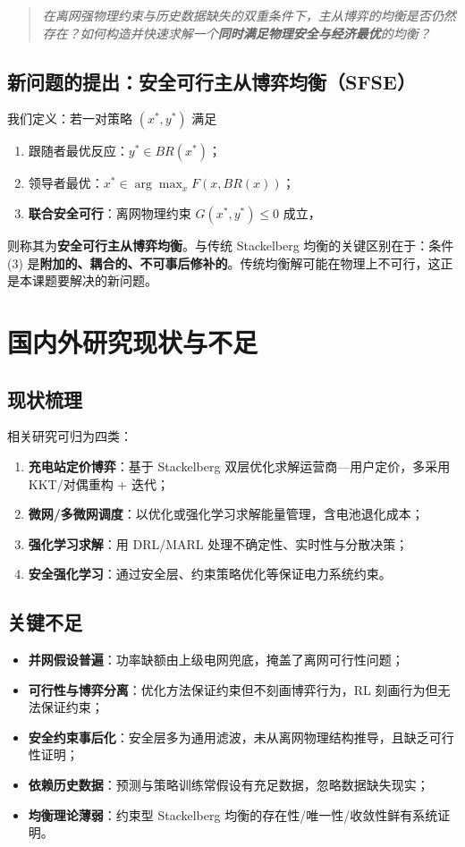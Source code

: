 \documentclass[UTF8,a4paper,11pt]{ctexart}
\begin{document}
\begin{quote}
\itshape 在离网强物理约束与历史数据缺失的双重条件下，主从博弈的均衡是否仍然存在？如何构造并快速求解一个\textbf{同时满足物理安全与经济最优}的均衡？
\end{quote}

\subsection{新问题的提出：安全可行主从博弈均衡（SFSE）}
我们定义：若一对策略 $(x^*, y^*)$ 满足
\begin{enumerate}
  \item 跟随者最优反应：$y^* \in BR(x^*)$；
  \item 领导者最优：$x^* \in \arg\max_{x} F(x, BR(x))$；
  \item \textbf{联合安全可行}：离网物理约束 $G(x^*, y^*) \le 0$ 成立，
\end{enumerate}
则称其为\textbf{安全可行主从博弈均衡}。与传统 Stackelberg 均衡的关键区别在于：条件 (3) 是\textbf{附加的、耦合的、不可事后修补的}。传统均衡解可能在物理上不可行，这正是本课题要解决的新问题。

\section{国内外研究现状与不足}

\subsection{现状梳理}
相关研究可归为四类：
\begin{enumerate}
  \item \textbf{充电站定价博弈}：基于 Stackelberg 双层优化求解运营商—用户定价，多采用 KKT/对偶重构 + 迭代\cite{ref1,ref2,ref3}；
  \item \textbf{微网/多微网调度}：以优化或强化学习求解能量管理，含电池退化成本\cite{ref4,ref5}；
  \item \textbf{强化学习求解}：用 DRL/MARL 处理不确定性、实时性与分散决策\cite{ref6,ref7,ref8}；
  \item \textbf{安全强化学习}：通过安全层、约束策略优化等保证电力系统约束\cite{ref9,ref10}。
\end{enumerate}

\subsection{关键不足}
\begin{itemize}
  \item \textbf{并网假设普遍}：功率缺额由上级电网兜底，掩盖了离网可行性问题；
  \item \textbf{可行性与博弈分离}：优化方法保证约束但不刻画博弈行为，RL 刻画行为但无法保证约束；
  \item \textbf{安全约束事后化}：安全层多为通用滤波，未从离网物理结构推导，且缺乏可行性证明；
  \item \textbf{依赖历史数据}：预测与策略训练常假设有充足数据，忽略数据缺失现实；
  \item \textbf{均衡理论薄弱}：约束型 Stackelberg 均衡的存在性/唯一性/收敛性鲜有系统证明。
\end{itemize}
\end{document}
